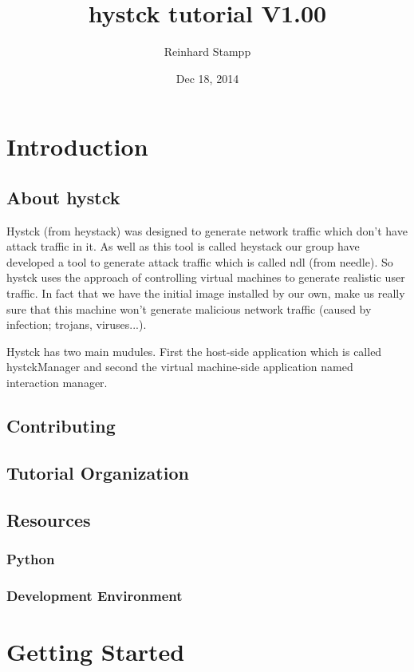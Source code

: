 \documentclass{report}
\title{hystck tutorial V1.00}
\author{Reinhard Stampp}
\date{Dec 18, 2014}
\begin{document}
  \maketitle
  \tableofcontents
  \chapter{Introduction}
    \section{About hystck}
    Hystck (from heystack) was designed to generate network traffic which don't have attack traffic in it. As well as this tool is called heystack our group have developed a tool to generate attack traffic which is called ndl (from needle). 
    So hystck uses the approach of controlling virtual machines to generate realistic user traffic. In fact that we have the initial image installed by our own, make us really sure that this machine won't generate malicious network traffic (caused by infection; trojans, viruses...). 

    Hystck has two main mudules. First the host-side application which is called hystckManager and second the virtual machine-side application named interaction manager. 
    \section{Contributing}

    \section{Tutorial Organization}

    \section{Resources}
      \subsection{Python}
      \subsection{Development Environment}
    
  \chapter{Getting Started}
\end{document}
